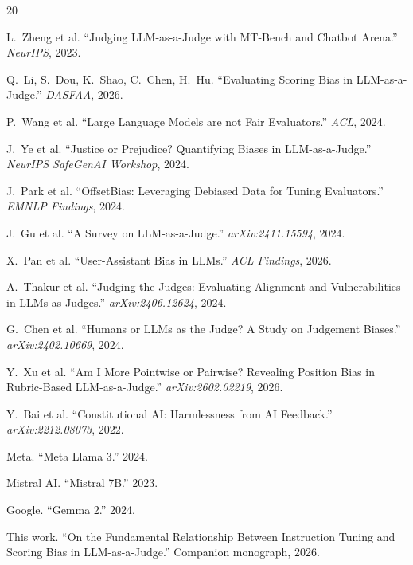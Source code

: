 \documentclass[11pt,twocolumn]{article}
\begin{document}
\begin{thebibliography}{20}

L.~Zheng et al. ``Judging LLM-as-a-Judge with MT-Bench and Chatbot Arena.'' \emph{NeurIPS}, 2023.

Q.~Li, S.~Dou, K.~Shao, C.~Chen, H.~Hu. ``Evaluating Scoring Bias in LLM-as-a-Judge.'' \emph{DASFAA}, 2026.

P.~Wang et al. ``Large Language Models are not Fair Evaluators.'' \emph{ACL}, 2024.

J.~Ye et al. ``Justice or Prejudice? Quantifying Biases in LLM-as-a-Judge.'' \emph{NeurIPS SafeGenAI Workshop}, 2024.

J.~Park et al. ``OffsetBias: Leveraging Debiased Data for Tuning Evaluators.'' \emph{EMNLP Findings}, 2024.

J.~Gu et al. ``A Survey on LLM-as-a-Judge.'' \emph{arXiv:2411.15594}, 2024.

X.~Pan et al. ``User-Assistant Bias in LLMs.'' \emph{ACL Findings}, 2026.

A.~Thakur et al. ``Judging the Judges: Evaluating Alignment and Vulnerabilities in LLMs-as-Judges.'' \emph{arXiv:2406.12624}, 2024.

G.~Chen et al. ``Humans or LLMs as the Judge? A Study on Judgement Biases.'' \emph{arXiv:2402.10669}, 2024.

Y.~Xu et al. ``Am I More Pointwise or Pairwise? Revealing Position Bias in Rubric-Based LLM-as-a-Judge.'' \emph{arXiv:2602.02219}, 2026.

Y.~Bai et al. ``Constitutional AI: Harmlessness from AI Feedback.'' \emph{arXiv:2212.08073}, 2022.

Meta. ``Meta Llama 3.'' 2024.

Mistral AI. ``Mistral 7B.'' 2023.

Google. ``Gemma 2.'' 2024.

This work. ``On the Fundamental Relationship Between Instruction Tuning and Scoring Bias in LLM-as-a-Judge.'' Companion monograph, 2026.

\end{thebibliography}
\end{document}
